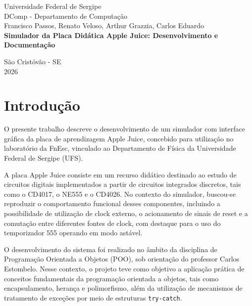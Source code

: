 \documentclass[12pt,a4paper]{article}
\begin{document}
\begin{titlepage}
    \centering
    
    \vspace*{3cm}
    
    {\large Universidade Federal de Sergipe}\\
    {\large DComp - Departamento de Computação}\\[3cm]
    
    {\large Francisco Passos, Renato Veloso, Arthur Grazzia, Carlos Eduardo}\\[4cm]
    
    {\Large \textbf{Simulador da Placa Didática Apple Juice: Desenvolvimento e Documentação}}\\[4cm]
    
    \vfill
    
    {\large São Cristóvão - SE}\\
    {\large 2026}
    
\end{titlepage}

\tableofcontents
\newpage


\section{Introdução}

O presente trabalho descreve o desenvolvimento de um simulador com interface gráfica da placa de aprendizagem Apple Juice, concebido para utilização no laboratório da FnEsc, vinculado ao Departamento de Física da Universidade Federal de Sergipe (UFS).

A placa Apple Juice consiste em um recurso didático destinado ao estudo de circuitos digitais implementados a partir de circuitos integrados discretos, tais como o CD4017, o NE555 e o CD4026. No contexto do simulador, buscou-se reproduzir o comportamento funcional desses componentes, incluindo a possibilidade de utilização de clock externo, o acionamento de sinais de reset e a comutação entre diferentes fontes de clock, com destaque para o uso do temporizador 555 operando em modo astável.

O desenvolvimento do sistema foi realizado no âmbito da disciplina de Programação Orientada a Objetos (POO), sob orientação do professor Carlos Estombelo. Nesse contexto, o projeto teve como objetivo a aplicação prática de conceitos fundamentais da programação orientada a objetos, tais como encapsulamento, herança e polimorfismo, além da utilização de mecanismos de tratamento de exceções por meio de estruturas \texttt{try-catch}.
\end{document}
